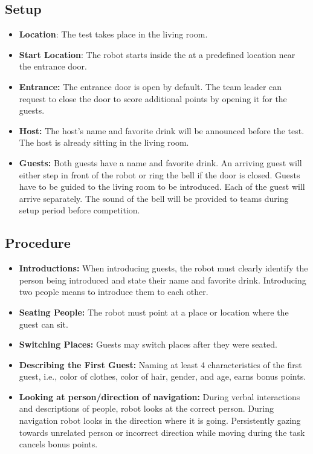 \subsection*{Setup}
\begin{itemize}
	\item \textbf{Location}: The test takes place in the living room.
	
	\item \textbf{Start Location}: The robot starts inside the \Arena{} at a predefined location near the entrance door.
	
	\item \textbf{Entrance:} The entrance door is open by default. The team leader can request to close the door to score additional points by opening it for the guests.

	\item \textbf{Host:} The host's name and favorite drink will be announced before the test. The host is already sitting in the living room.

	\item \textbf{Guests:} Both guests have a name and favorite drink. An arriving guest will either step in front of the robot or ring the bell if the door is closed. Guests have to be guided to the living room to be introduced. Each of the guest will arrive separately. The sound of the bell will be provided to teams
	during setup period before competition.

\end{itemize}

\subsection*{Procedure}
\begin{itemize}
    \item \textbf{Introductions:} When introducing guests, the robot must clearly identify the person being introduced and state their name and favorite drink. Introducing two people means to introduce them to each other.
	
	\item \textbf{Seating People:} The robot must point at a place or location where the guest can sit.
	
	\item \textbf{Switching Places:} Guests may switch places after they were seated.
	
	\item \textbf{Describing the First Guest:} Naming at least 4 characteristics of the first guest, i.e., color of clothes, color of hair, gender, and age, earns bonus points.
	\item \textbf{Looking at person/direction of navigation:} During verbal interactions and descriptions of people, robot 
	looks at the correct person. During navigation robot looks in the direction where it is going. Persistently gazing towards unrelated 
	person or incorrect direction while moving during the task cancels bonus points. 
\end{itemize}

